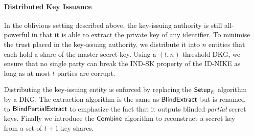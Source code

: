 	\paragraph{Distributed Key Issuance} In the oblivious setting described above, the key-issuing authority is still all-powerful in that it is able to extract the private key of any identifier. To minimise the trust placed in the key-issuing authority, we distribute it into $n$ entities that each hold a share of the master secret key. Using a $(t, n)$-threshold DKG, we ensure that no single party can break the IND-SK property of the ID-NIKE as long as at most $t$ parties are corrupt.
	
	Distributing the key-issuing entity is enforced by replacing the $\mathsf{Setup}_E$ algorithm by a DKG. The extraction algorithm is the same as $\mathsf{BlindExtract}$ but is renamed to $\mathsf{BlindPartialExtract}$ to emphasize the fact that it outputs blinded \emph{partial} secret keys. Finally we introduce the $\mathsf{Combine}$ algorithm to reconstruct a secret key from a set of $t+1$ key shares.
	
%	

